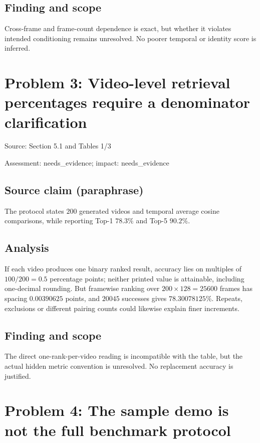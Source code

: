 \documentclass[11pt]{article}
\begin{document}
\subsection*{Finding and scope}

Cross-frame and frame-count dependence is exact, but whether it violates intended conditioning remains unresolved. No poorer temporal or identity score is inferred.

\section*{Problem 3: Video-level retrieval percentages require a denominator clarification}

Source: Section 5.1 and Tables 1/3

Assessment: needs\_evidence; impact: needs\_evidence

\subsection*{Source claim (paraphrase)}

The protocol states \(200\) generated videos and temporal average cosine comparisons, while reporting Top-1 \(78.3\%\) and Top-5 \(90.2\%\).

\subsection*{Analysis}

If each video produces one binary ranked result, accuracy lies on multiples of \(100/200=0.5\) percentage points; neither printed value is attainable, including one-decimal rounding. But framewise ranking over \(200\times128=25600\) frames has spacing \(0.00390625\) points, and \(20045\) successes gives \(78.30078125\%\). Repeats, exclusions or different pairing counts could likewise explain finer increments.

\subsection*{Finding and scope}

The direct one-rank-per-video reading is incompatible with the table, but the actual hidden metric convention is unresolved. No replacement accuracy is justified.

\section*{Problem 4: The sample demo is not the full benchmark protocol}
\end{document}
